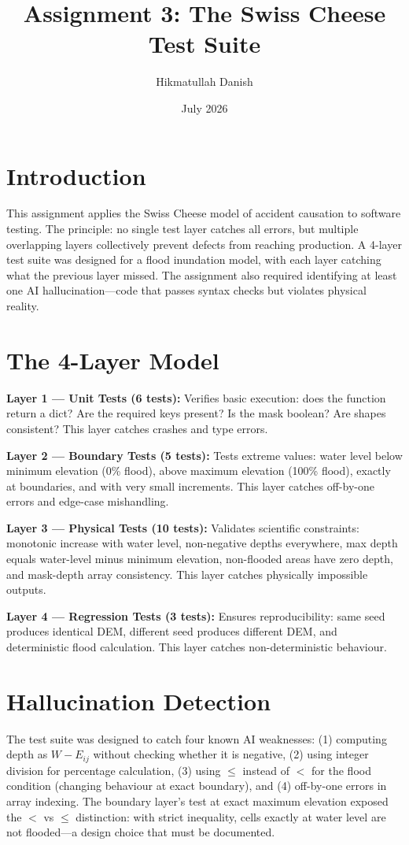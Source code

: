 \documentclass[12pt,a4paper]{article}
\title{Assignment 3: The Swiss Cheese Test Suite}
\author{Hikmatullah Danish \quad 3125999089}
\date{July 2026}
\begin{document}
\maketitle

\section{Introduction}
This assignment applies the Swiss Cheese model of accident causation to software testing. The principle: no single test layer catches all errors, but multiple overlapping layers collectively prevent defects from reaching production. A 4-layer test suite was designed for a flood inundation model, with each layer catching what the previous layer missed. The assignment also required identifying at least one AI hallucination—code that passes syntax checks but violates physical reality.

\section{The 4-Layer Model}
\textbf{Layer 1 — Unit Tests (6 tests):} Verifies basic execution: does the function return a dict? Are the required keys present? Is the mask boolean? Are shapes consistent? This layer catches crashes and type errors.

\textbf{Layer 2 — Boundary Tests (5 tests):} Tests extreme values: water level below minimum elevation (0\% flood), above maximum elevation (100\% flood), exactly at boundaries, and with very small increments. This layer catches off-by-one errors and edge-case mishandling.

\textbf{Layer 3 — Physical Tests (10 tests):} Validates scientific constraints: monotonic increase with water level, non-negative depths everywhere, max depth equals water-level minus minimum elevation, non-flooded areas have zero depth, and mask-depth array consistency. This layer catches physically impossible outputs.

\textbf{Layer 4 — Regression Tests (3 tests):} Ensures reproducibility: same seed produces identical DEM, different seed produces different DEM, and deterministic flood calculation. This layer catches non-deterministic behaviour.

\section{Hallucination Detection}
The test suite was designed to catch four known AI weaknesses: (1) computing depth as $W - E_{ij}$ without checking whether it is negative, (2) using integer division for percentage calculation, (3) using $\leq$ instead of $<$ for the flood condition (changing behaviour at exact boundary), and (4) off-by-one errors in array indexing. The boundary layer's test at exact maximum elevation exposed the $<$ vs $\leq$ distinction: with strict inequality, cells exactly at water level are not flooded—a design choice that must be documented.
\end{document}

